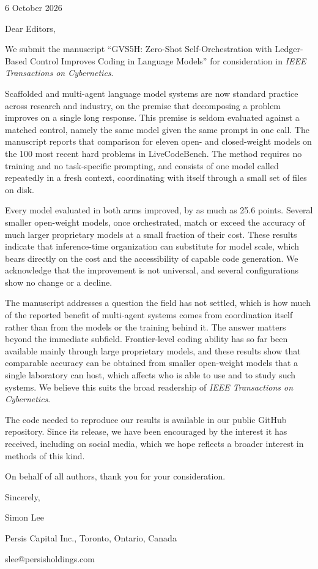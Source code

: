 \documentclass[11pt,letterpaper]{article}
\begin{document}
6 October 2026

\bigskip

Dear Editors,

We submit the manuscript ``GVS5H: Zero-Shot Self-Orchestration with Ledger-Based Control
Improves Coding in Language Models'' for consideration in \textit{IEEE Transactions on Cybernetics}.

Scaffolded and multi-agent language model systems are now standard practice across research and
industry, on the premise that decomposing a problem improves on a single long response. This
premise is seldom evaluated against a matched control, namely the same model given the same
prompt in one call. The manuscript reports that comparison for eleven open- and closed-weight
models on the 100 most recent hard problems in LiveCodeBench. The method requires no training
and no task-specific prompting, and consists of one model called repeatedly in a fresh context,
coordinating with itself through a small set of files on disk.

Every model evaluated in both arms improved, by as much as 25.6 points. Several smaller
open-weight models, once orchestrated, match or exceed the accuracy of much larger proprietary
models at a small fraction of their cost. These results indicate that inference-time
organization can substitute for model scale, which bears directly on the cost and the
accessibility of capable code generation. We acknowledge that the improvement is not universal,
and several configurations show no change or a decline.

The manuscript addresses a question the field has not settled, which is how much of the reported
benefit of multi-agent systems comes from coordination itself rather than from the models or the
training behind it. The answer matters beyond the immediate subfield. Frontier-level coding ability
has so far been available mainly through large proprietary models, and these results
show that comparable accuracy can be obtained from smaller open-weight models that a single
laboratory can host, which affects who is able to use and to study such systems. We believe this
suits the broad readership of \textit{IEEE Transactions on Cybernetics}.

The code needed to reproduce our results is available in our public GitHub repository. Since its
release, we have been encouraged by the interest it has received, including on social media,
which we hope reflects a broader interest in methods of this kind.

On behalf of all authors, thank you for your consideration.

\bigskip

Sincerely,

\bigskip

Simon Lee

Persis Capital Inc., Toronto, Ontario, Canada

slee@persisholdings.com
\end{document}
